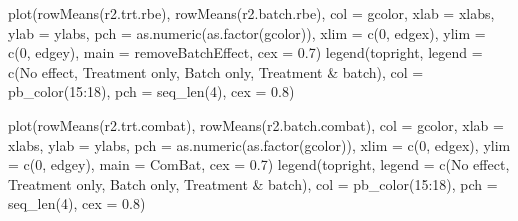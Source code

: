 \documentclass[
]{book}
\newenvironment{Shaded}{\begin{snugshade}}{\end{snugshade}}
\newcommand{\AttributeTok}[1]{\textcolor[rgb]{0.77,0.63,0.00}{#1}}
\newcommand{\DecValTok}[1]{\textcolor[rgb]{0.00,0.00,0.81}{#1}}
\newcommand{\FloatTok}[1]{\textcolor[rgb]{0.00,0.00,0.81}{#1}}
\newcommand{\FunctionTok}[1]{\textcolor[rgb]{0.00,0.00,0.00}{#1}}
\newcommand{\NormalTok}[1]{#1}
\newcommand{\SpecialCharTok}[1]{\textcolor[rgb]{0.00,0.00,0.00}{#1}}
\newcommand{\StringTok}[1]{\textcolor[rgb]{0.31,0.60,0.02}{#1}}
\begin{document}
\begin{Shaded}
\begin{Highlighting}[]
\FunctionTok{plot}\NormalTok{(}\FunctionTok{rowMeans}\NormalTok{(r2.trt.rbe), }\FunctionTok{rowMeans}\NormalTok{(r2.batch.rbe), }\AttributeTok{col =}\NormalTok{ gcolor, }
     \AttributeTok{xlab =}\NormalTok{ xlabs, }\AttributeTok{ylab =}\NormalTok{ ylabs, }\AttributeTok{pch =} \FunctionTok{as.numeric}\NormalTok{(}\FunctionTok{as.factor}\NormalTok{(gcolor)),}
     \AttributeTok{xlim =} \FunctionTok{c}\NormalTok{(}\DecValTok{0}\NormalTok{, edgex), }\AttributeTok{ylim =} \FunctionTok{c}\NormalTok{(}\DecValTok{0}\NormalTok{, edgey), }
     \AttributeTok{main =} \StringTok{\textquotesingle{}removeBatchEffect\textquotesingle{}}\NormalTok{, }\AttributeTok{cex =} \FloatTok{0.7}\NormalTok{)}
\FunctionTok{legend}\NormalTok{(}\StringTok{\textquotesingle{}topright\textquotesingle{}}\NormalTok{, }\AttributeTok{legend =} \FunctionTok{c}\NormalTok{(}\StringTok{\textquotesingle{}No effect\textquotesingle{}}\NormalTok{, }\StringTok{\textquotesingle{}Treatment only\textquotesingle{}}\NormalTok{, }
                              \StringTok{\textquotesingle{}Batch only\textquotesingle{}}\NormalTok{, }\StringTok{\textquotesingle{}Treatment \& batch\textquotesingle{}}\NormalTok{), }
       \AttributeTok{col =} \FunctionTok{pb\_color}\NormalTok{(}\DecValTok{15}\SpecialCharTok{:}\DecValTok{18}\NormalTok{), }\AttributeTok{pch =} \FunctionTok{seq\_len}\NormalTok{(}\DecValTok{4}\NormalTok{), }\AttributeTok{cex =} \FloatTok{0.8}\NormalTok{)}

\FunctionTok{plot}\NormalTok{(}\FunctionTok{rowMeans}\NormalTok{(r2.trt.combat), }\FunctionTok{rowMeans}\NormalTok{(r2.batch.combat), }\AttributeTok{col =}\NormalTok{ gcolor, }
     \AttributeTok{xlab =}\NormalTok{ xlabs, }\AttributeTok{ylab =}\NormalTok{ ylabs, }\AttributeTok{pch =} \FunctionTok{as.numeric}\NormalTok{(}\FunctionTok{as.factor}\NormalTok{(gcolor)),}
     \AttributeTok{xlim =} \FunctionTok{c}\NormalTok{(}\DecValTok{0}\NormalTok{, edgex), }\AttributeTok{ylim =} \FunctionTok{c}\NormalTok{(}\DecValTok{0}\NormalTok{, edgey), }\AttributeTok{main =} \StringTok{\textquotesingle{}ComBat\textquotesingle{}}\NormalTok{, }\AttributeTok{cex =} \FloatTok{0.7}\NormalTok{)}
\FunctionTok{legend}\NormalTok{(}\StringTok{\textquotesingle{}topright\textquotesingle{}}\NormalTok{, }\AttributeTok{legend =} \FunctionTok{c}\NormalTok{(}\StringTok{\textquotesingle{}No effect\textquotesingle{}}\NormalTok{, }\StringTok{\textquotesingle{}Treatment only\textquotesingle{}}\NormalTok{, }
                              \StringTok{\textquotesingle{}Batch only\textquotesingle{}}\NormalTok{, }\StringTok{\textquotesingle{}Treatment \& batch\textquotesingle{}}\NormalTok{), }
       \AttributeTok{col =} \FunctionTok{pb\_color}\NormalTok{(}\DecValTok{15}\SpecialCharTok{:}\DecValTok{18}\NormalTok{), }\AttributeTok{pch =} \FunctionTok{seq\_len}\NormalTok{(}\DecValTok{4}\NormalTok{), }\AttributeTok{cex =} \FloatTok{0.8}\NormalTok{)}


\end{Highlighting}
\end{Shaded}
\end{document}
